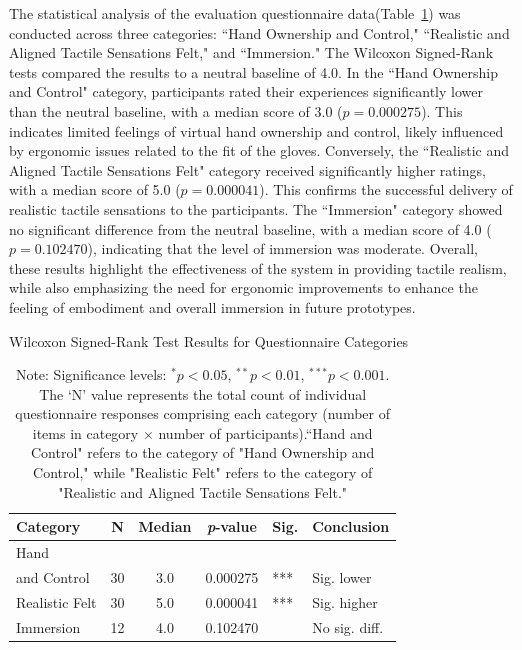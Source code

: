 \documentclass[a4paper,twocolumn]{article}
\begin{document}
The statistical analysis of the evaluation questionnaire data(Table~\ref{tab:wilcoxon_category_results}) was conducted across three categories: ``Hand Ownership and Control," ``Realistic and Aligned Tactile Sensations Felt," and ``Immersion." The Wilcoxon Signed-Rank tests compared the results to a neutral baseline of 4.0.
In the ``Hand Ownership and Control" category, participants rated their experiences significantly lower than the neutral baseline, with a median score of 3.0 ($p=0.000275$). This indicates limited feelings of virtual hand ownership and control, likely influenced by ergonomic issues related to the fit of the gloves.
Conversely, the ``Realistic and Aligned Tactile Sensations Felt" category received significantly higher ratings, with a median score of 5.0 ($p=0.000041$). This confirms the successful delivery of realistic tactile sensations to the participants.
The ``Immersion" category showed no significant difference from the neutral baseline, with a median score of 4.0 ($p=0.102470$), indicating that the level of immersion was moderate.
Overall, these results highlight the effectiveness of the system in providing tactile realism, while also emphasizing the need for ergonomic improvements to enhance the feeling of embodiment and overall immersion in future prototypes.
\begin{table}[H]
  \small
    \centering
    \caption{Wilcoxon Signed-Rank Test Results for Questionnaire Categories}
    \label{tab:wilcoxon_category_results}
    \begin{tabular}{@{} p{1.5cm} c c c l p{1.5cm} @{}}
        \toprule
        \textbf{Category} & \textbf{N} & \textbf{Median} & \textbf{\textit{p}-value} & \textbf{Sig.} & \textbf{Conclusion} \\
        \midrule
        Hand \\ and Control & 30 & 3.0 & 0.000275 & *** & Sig. lower\\ %
        \midrule
        Realistic Felt & 30 & 5.0 & 0.000041 & *** & Sig. higher\\ %
        \midrule
        Immersion & 12 & 4.0 & 0.102470 & & No sig. diff. \\
        \bottomrule
    \end{tabular}
    \caption*{Note: Significance levels: $^* p < 0.05$, $^{**} p < 0.01$, $^{***} p < 0.001$. The `N' value represents the total count of individual questionnaire responses comprising each category (number of items in category $\times$ number of participants).``Hand and Control" refers to the category of "Hand Ownership and Control," while "Realistic Felt" refers to the category of "Realistic and Aligned Tactile Sensations Felt." }
\end{table}
\end{document}
